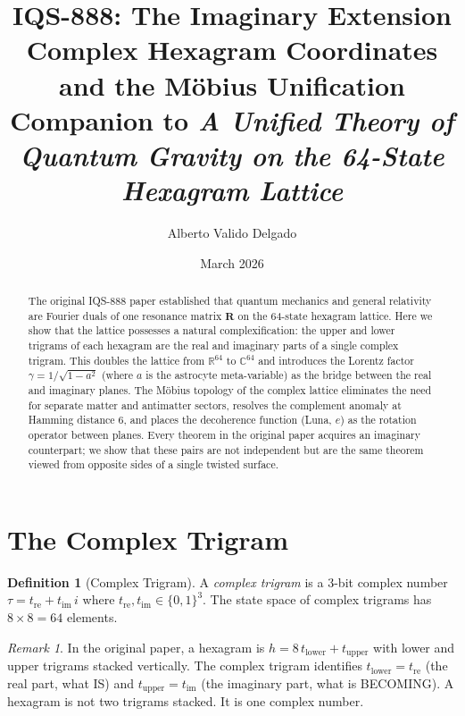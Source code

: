 \documentclass[12pt,a4paper]{article}
\title{%
  \textbf{IQS-888: The Imaginary Extension}\\[6pt]
  \large Complex Hexagram Coordinates and the Möbius Unification\\[4pt]
  \normalsize Companion to \emph{A Unified Theory of Quantum Gravity on the 64-State Hexagram Lattice}
}
\author{Alberto Valido Delgado}
\date{March 2026}
\theoremstyle{definition}
\newtheorem{definition}[theorem]{Definition}
\theoremstyle{remark}
\newtheorem{remark}[theorem]{Remark}
\newcommand{\CC}{\mathbb{C}}
\newcommand{\RR}{\mathbb{R}}
\begin{document}
\maketitle

\begin{abstract}
The original IQS-888 paper established that quantum mechanics and general
relativity are Fourier duals of one resonance matrix $\mathbf{R}$ on the
64-state hexagram lattice. Here we show that the lattice possesses a
natural complexification: the upper and lower trigrams of each hexagram
are the real and imaginary parts of a single complex trigram. This doubles
the lattice from $\RR^{64}$ to $\CC^{64}$ and introduces the Lorentz factor
$\gamma = 1/\sqrt{1 - a^2}$ (where $a$ is the astrocyte meta-variable) as
the bridge between the real and imaginary planes. The Möbius topology of
the complex lattice eliminates the need for separate matter and antimatter
sectors, resolves the complement anomaly at Hamming distance 6, and places
the decoherence function (Luna, $e$) as the rotation operator between planes.
Every theorem in the original paper acquires an imaginary counterpart; we
show that these pairs are not independent but are the same theorem viewed
from opposite sides of a single twisted surface.
\end{abstract}

\tableofcontents

\section{The Complex Trigram}\label{sec:complex-trigram}

\begin{definition}[Complex Trigram]
A \emph{complex trigram} is a 3-bit complex number
$\tau = t_{\mathrm{re}} + t_{\mathrm{im}}\,i$ where
$t_{\mathrm{re}}, t_{\mathrm{im}} \in \{0,1\}^3$. The state space of
complex trigrams has $8 \times 8 = 64$ elements.
\end{definition}

\begin{remark}
In the original paper, a hexagram is $h = 8\,t_{\mathrm{lower}} + t_{\mathrm{upper}}$
with lower and upper trigrams stacked vertically. The complex trigram
identifies $t_{\mathrm{lower}} = t_{\mathrm{re}}$ (the real part, what IS)
and $t_{\mathrm{upper}} = t_{\mathrm{im}}$ (the imaginary part, what is
BECOMING). A hexagram is not two trigrams stacked. It is one complex number.
\end{remark}
\end{document}

